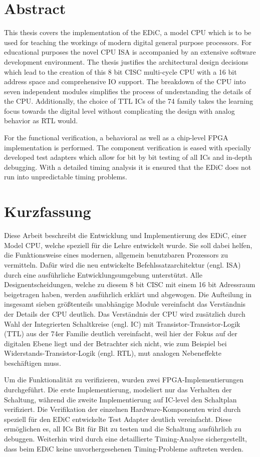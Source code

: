 \chapter*{Abstract}
This thesis covers the implementation of the \gls{EDiC}, a model \gls{CPU} which is to be used for teaching the workings of modern digital general purpose processors.
For educational purposes the novel \gls{CPU} \gls{ISA} is accompanied by an extensive software development environment.
The thesis justifies the architectural design decisions which lead to the creation of this 8 bit \gls{CISC} multi-cycle \gls{CPU} with a 16 bit address space and comprehensive \gls{IO} support.
The breakdown of the \gls{CPU} into seven independent modules simplifies the process of understanding the details of the \gls{CPU}.
Additionally, the choice of \gls{TTL} \glspl{IC} of the 74 family takes the learning focus towards the digital level without complicating the design with analog behavior as \gls{RTL} would.

For the functional verification, a behavioral as well as a chip-level \gls{FPGA} implementation is performed.
The component verification is eased with specially developed test adapters which allow for bit by bit testing of all \glspl{IC} and in-depth debugging.
With a detailed timing analysis it is ensured that the \gls{EDiC} does not run into unpredictable timing problems.
\begingroup
\renewcommand{\cleardoublepage}{}
\clearpage
\chapter*{Kurzfassung}
\endgroup
\glsresetall
Diese Arbeit beschreibt die Entwicklung und Implementierung des \gls{EDiC}, einer Model \gls{CPU}, welche speziell für die Lehre entwickelt wurde.
Sie soll dabei helfen, die Funktionsweise eines modernen, allgemein benutzbaren Prozessors zu vermitteln.
Dafür wird die neu entwickelte Befehlssatzarchitektur (engl. ISA) durch eine ausführliche Entwicklungsumgebung unterstützt.
Alle Designentscheidungen, welche zu diesem 8 bit \gls{CISC} mit einem 16 bit Adressraum beigetragen haben, werden ausführlich erklärt und abgewogen.
Die Aufteilung in insgesamt sieben größtenteils unabhängige Module vereinfacht das Verständnis der Details der \gls{CPU} deutlich.
Das Verständnis der \gls{CPU} wird zusätzlich durch Wahl der Integrierten Schaltkreise (engl. IC) mit Transistor-Transistor-Logik (TTL) aus der 74er Familie deutlich vereinfacht, weil hier der Fokus auf der digitalen Ebene liegt und der Betrachter sich nicht, wie zum Beispiel bei Widerstands-Transistor-Logik (engl. RTL), mut analogen Nebeneffekte beschäftigen muss.

Um die Funktionalität zu verifizieren, wurden zwei \gls{FPGA}-Implementierungen durchgeführt.
Die erste Implementierung, modeliert nur das Verhalten der Schaltung, während die zweite Implementierung auf \gls{IC}-level den Schaltplan verifiziert.
Die Verifikation der einzelnen Hardware-Komponenten wird durch speziell für den \gls{EDiC} entwickelte Test Adapter deutlich vereinfacht.
Diese ermöglichen es, all \glspl{IC} Bit für Bit zu testen und die Schaltung ausführlich zu debuggen.
Weiterhin wird durch eine detaillierte Timing-Analyse sichergestellt, dass beim \gls{EDiC} keine unvorhergesehenen Timing-Probleme auftreten werden.